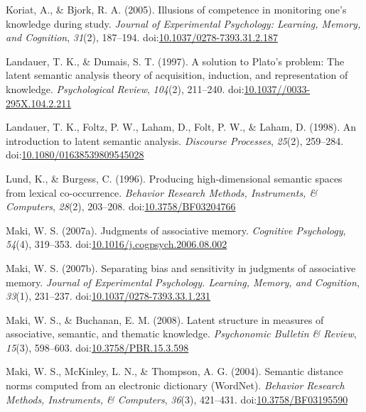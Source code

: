 \documentclass[english,,man]{apa6}
\begin{document}
\leavevmode\hypertarget{ref-Koriat2005}{}%
Koriat, A., \& Bjork, R. A. (2005). Illusions of competence in monitoring one's knowledge during study. \emph{Journal of Experimental Psychology: Learning, Memory, and Cognition}, \emph{31}(2), 187--194. doi:\href{https://doi.org/10.1037/0278-7393.31.2.187}{10.1037/0278-7393.31.2.187}

\leavevmode\hypertarget{ref-Landauer1997}{}%
Landauer, T. K., \& Dumais, S. T. (1997). A solution to Plato's problem: The latent semantic analysis theory of acquisition, induction, and representation of knowledge. \emph{Psychological Review}, \emph{104}(2), 211--240. doi:\href{https://doi.org/10.1037//0033-295X.104.2.211}{10.1037//0033-295X.104.2.211}

\leavevmode\hypertarget{ref-Landauer1998}{}%
Landauer, T. K., Foltz, P. W., Laham, D., Folt, P. W., \& Laham, D. (1998). An introduction to latent semantic analysis. \emph{Discourse Processes}, \emph{25}(2), 259--284. doi:\href{https://doi.org/10.1080/01638539809545028}{10.1080/01638539809545028}

\leavevmode\hypertarget{ref-Lund1996}{}%
Lund, K., \& Burgess, C. (1996). Producing high-dimensional semantic spaces from lexical co-occurrence. \emph{Behavior Research Methods, Instruments, \& Computers}, \emph{28}(2), 203--208. doi:\href{https://doi.org/10.3758/BF03204766}{10.3758/BF03204766}

\leavevmode\hypertarget{ref-Maki2007a}{}%
Maki, W. S. (2007a). Judgments of associative memory. \emph{Cognitive Psychology}, \emph{54}(4), 319--353. doi:\href{https://doi.org/10.1016/j.cogpsych.2006.08.002}{10.1016/j.cogpsych.2006.08.002}

\leavevmode\hypertarget{ref-Maki2007}{}%
Maki, W. S. (2007b). Separating bias and sensitivity in judgments of associative memory. \emph{Journal of Experimental Psychology. Learning, Memory, and Cognition}, \emph{33}(1), 231--237. doi:\href{https://doi.org/10.1037/0278-7393.33.1.231}{10.1037/0278-7393.33.1.231}

\leavevmode\hypertarget{ref-Maki2008}{}%
Maki, W. S., \& Buchanan, E. M. (2008). Latent structure in measures of associative, semantic, and thematic knowledge. \emph{Psychonomic Bulletin \& Review}, \emph{15}(3), 598--603. doi:\href{https://doi.org/10.3758/PBR.15.3.598}{10.3758/PBR.15.3.598}

\leavevmode\hypertarget{ref-Maki2004}{}%
Maki, W. S., McKinley, L. N., \& Thompson, A. G. (2004). Semantic distance norms computed from an electronic dictionary (WordNet). \emph{Behavior Research Methods, Instruments, \& Computers}, \emph{36}(3), 421--431. doi:\href{https://doi.org/10.3758/BF03195590}{10.3758/BF03195590}
\end{document}
